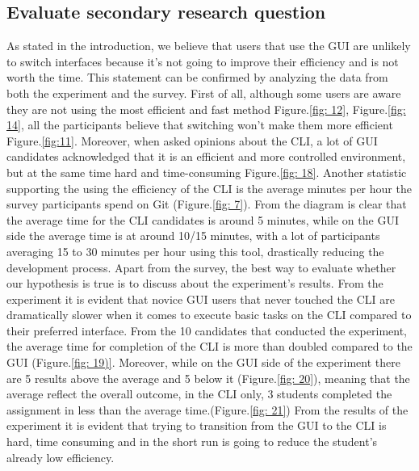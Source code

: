 \documentclass[]{report}
\begin{document}
	\subsection{Evaluate secondary research question}
	As stated in the introduction, we believe that users that use the GUI are unlikely to switch interfaces because it's not going to improve their efficiency and is not worth the time.
	This statement can be confirmed by analyzing the data from both the experiment and the survey.
	First of all, although some users are aware they are not using the most efficient and fast method Figure.\ref{fig: 12}, Figure.\ref{fig: 14}, all the participants believe that switching won't make them more efficient Figure.\ref{fig:11}.
	Moreover, when asked opinions about the CLI, a lot of GUI candidates acknowledged that it is an efficient and more controlled environment, but at the same time hard and time-consuming Figure.\ref{fig: 18}.
	Another statistic supporting the using the efficiency of the CLI is the average minutes per hour the survey participants spend on Git (Figure.\ref{fig: 7}). From the diagram is clear that the average time for the CLI candidates is around 5 minutes, while on the GUI side the average time is at around 10/15 minutes, with a lot of participants averaging 15 to 30 minutes per hour using this tool, drastically reducing the development process.
	Apart from the survey, the best way to evaluate whether our hypothesis is true is to discuss about the experiment's results.
	From the experiment it is evident that novice GUI users that never touched the CLI are dramatically slower when it comes to execute basic tasks on the CLI compared to their preferred interface.
	From the 10 candidates that conducted the experiment, the average time for completion of the CLI is more than doubled compared to the GUI (Figure.\ref{fig: 19)}. Moreover, while on the GUI side of the experiment there are 5 results above the average and 5 below it (Figure.\ref{fig: 20}), meaning that the average reflect the overall outcome, in the CLI only, 3 students completed the assignment in less than the average time.(Figure.\ref{fig: 21}) From the results of the experiment it is evident that trying to transition from the GUI to the CLI is hard, time consuming and in the short run is going to reduce the student's already low efficiency.
	
\end{document}
